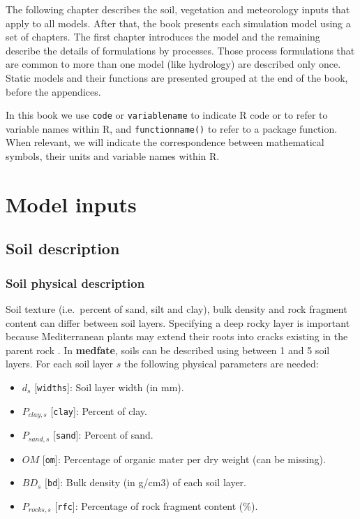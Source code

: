 \documentclass[]{book}
\providecommand{\tightlist}{%
  \setlength{\itemsep}{0pt}\setlength{\parskip}{0pt}}
\begin{document}
The following chapter describes the soil, vegetation and meteorology inputs that apply to all models. After that, the book presents each simulation model using a set of chapters. The first chapter introduces the model and the remaining describe the details of formulations by processes. Those process formulations that are common to more than one model (like hydrology) are described only once. Static models and their functions are presented grouped at the end of the book, before the appendices.

In this book we use \texttt{code} or \texttt{variablename} to indicate R code or to refer to variable names within R, and \texttt{functionname()} to refer to a package function. When relevant, we will indicate the correspondence between mathematical symbols, their units and variable names within R.

\hypertarget{model-inputs}{%
\chapter{Model inputs}\label{model-inputs}}

\hypertarget{soil-description}{%
\section{Soil description}\label{soil-description}}

\hypertarget{soil-physical-description}{%
\subsection{Soil physical description}\label{soil-physical-description}}

Soil texture (i.e.~percent of sand, silt and clay), bulk density and rock fragment content can differ between soil layers. Specifying a deep rocky layer is important because Mediterranean plants may extend their roots into cracks existing in the parent rock \citep{Ruffault2013}. In \textbf{medfate}, soils can be described using between 1 and 5 soil layers. For each soil layer \(s\) the following physical parameters are needed:

\begin{itemize}
\tightlist
\item
  \(d_{s}\) {[}\texttt{widths}{]}: Soil layer width (in mm).
\item
  \(P_{clay,s}\) {[}\texttt{clay}{]}: Percent of clay.
\item
  \(P_{sand,s}\) {[}\texttt{sand}{]}: Percent of sand.
\item
  \(OM\) {[}\texttt{om}{]}: Percentage of organic mater per dry weight (can be missing).
\item
  \(BD_{s}\) {[}\texttt{bd}{]}: Bulk density (in g/cm3) of each soil layer.
\item
  \(P_{rocks,s}\) {[}\texttt{rfc}{]}: Percentage of rock fragment content (\%).
\end{itemize}
\end{document}
